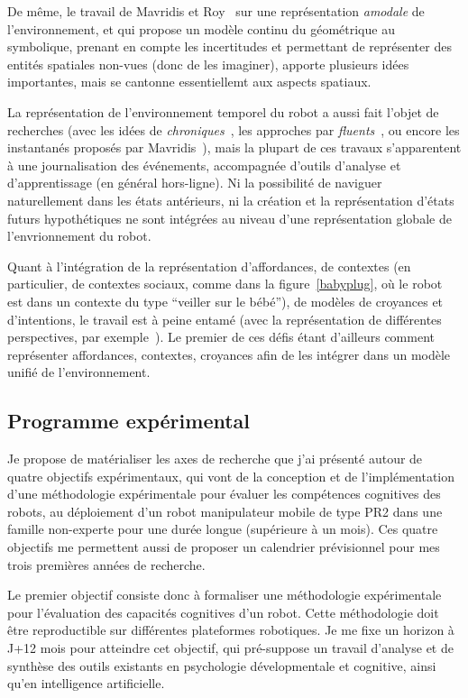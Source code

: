 \documentclass[a4paper]{article}
\begin{document}
De même, le travail de Mavridis et Roy~\cite{Mavridis2006} sur une représentation
\emph{amodale} de l'environnement, et qui propose un modèle continu du géométrique
au symbolique, prenant en compte les incertitudes et permettant de représenter
des entités spatiales non-vues (donc de les imaginer), apporte plusieurs idées
importantes, mais se cantonne essentiellemt aux aspects spatiaux.

La représentation de l'environnement temporel du robot a aussi fait l'objet de
recherches (avec les idées de \emph{chroniques}~\cite{Ghallab1996}, les
approches par \emph{fluents}~\cite{mosenlechner2010becoming}, ou encore les
instantanés proposés par Mavridis~\cite{Mavridis2006}), mais la plupart de ces
travaux s'apparentent à une journalisation des événements, accompagnée d'outils
d'analyse et d'apprentissage (en général hors-ligne). Ni la possibilité de
naviguer naturellement dans les états antérieurs, ni la création et la
représentation d'états futurs hypothétiques ne sont intégrées au niveau d'une
représentation globale de l'envrionnement du robot.

Quant à l'intégration de la représentation d'affordances, de contextes (en
particulier, de contextes sociaux, comme dans la figure~\ref{babyplug}, où le
robot est dans un contexte du type ``veiller sur le bébé''), de modèles de
croyances et d'intentions, le travail est à peine entamé (avec la représentation
de différentes perspectives, par exemple~\cite{ros2010which}). Le premier de ces
défis étant d'ailleurs comment représenter affordances, contextes, croyances
afin de les intégrer dans un modèle unifié de l'environnement.


\subsection{Programme expérimental}

Je propose de matérialiser les axes de recherche que j'ai présenté autour de
quatre objectifs expérimentaux, qui vont de la conception et de
l'implémentation d'une méthodologie expérimentale pour évaluer les compétences
cognitives des robots, au déploiement d'un robot manipulateur mobile de type
PR2 dans une famille non-experte pour une durée longue (supérieure à un mois).
Ces quatre objectifs me permettent aussi de proposer un calendrier prévisionnel
pour mes trois premières années de recherche.

Le premier objectif consiste donc à formaliser une méthodologie expérimentale
pour l'évaluation des capacités cognitives d'un robot. Cette méthodologie doit
être reproductible sur différentes plateformes robotiques. Je me fixe un horizon
à J+12 mois pour atteindre cet objectif, qui pré-suppose un travail d'analyse et de
synthèse des outils existants en psychologie dévelopmentale et cognitive, ainsi
qu'en intelligence artificielle.
\end{document}
